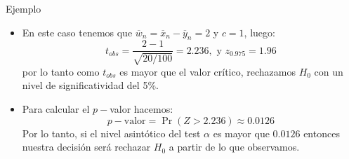 \documentclass{beamer}
\theoremstyle{definition}
\begin{document}
\begin{frame}{\color{rosee} Ejemplo} \small 
\begin{itemize}
    \item  En este caso tenemos que $\overline{w}_n = \overline{x}_n - \overline{y}_n = 2$ y $c=1$, luego: 
  \[ t_{obs} = \frac{2 - 1}{\sqrt{20 /100}}= 2.236, \text{ y } z_{0.975}=1.96\]
 por lo tanto como $t_{obs}$ es mayor que el valor crítico, rechazamos $H_0$ con un nivel de significatividad del 5\%.\medskip
\item Para calcular el $p-$valor hacemos:
\[p-\text{valor} = \Pr(Z>2.236)\approx 0.0126\]
Por lo tanto, si el nivel asintótico del test $\alpha$  es mayor que $0.0126$ entonces nuestra decisión será rechazar $H_0$ a partir de lo que observamos.
\end{itemize} 
 
\end{frame}

\end{document}
